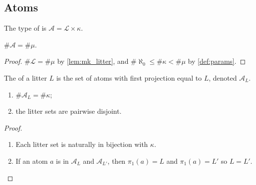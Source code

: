 \subsection{Atoms}

\begin{definition}
    The type of  is \( \mathcal A = \mathcal L \times \kappa \).
\end{definition}
\begin{lemma}
    \label{lem:mk_atom}
    \( \#\mathcal A = \#\mu \).
\end{lemma}
\begin{proof}
    \( \#\mathcal L = \#\mu \) by \cref{lem:mk_litter}, and \( \#\aleph_0 \leq \#\kappa < \#\mu \) by \cref{def:params}.
\end{proof}
\begin{definition}
    The  of a litter \( L \) is the set of atoms with first projection equal to \( L \), denoted \( \mathcal A_L \).
\end{definition}
\begin{lemma}
    \label{lem:litterSet}
    \begin{enumerate}
        \item \( \#\mathcal A_L = \#\kappa \);
        \item the litter sets are pairwise disjoint.
    \end{enumerate}
\end{lemma}
\begin{proof}
    \begin{enumerate}
        \item Each litter set is naturally in bijection with \( \kappa \).
        \item If an atom \( a \) is in \( \mathcal A_L \) and \( \mathcal A_{L'} \), then \( \pi_1(a) = L \) and \( \pi_1(a) = L' \) so \( L = L' \).
    \end{enumerate}
\end{proof}
